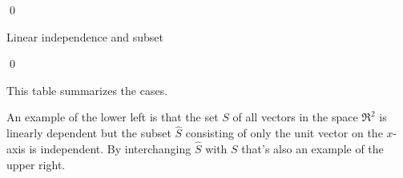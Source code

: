 \documentclass[10pt,t]{beamer}
\begin{document}
\begin{frame}

\pause
\pf
{}
\qed
\end{frame}




\begin{frame}{Linear independence and subset}
\lm[le:SubsetPreserveLI]

\pf
{}
\qed

\pause
\medskip
This table summarizes the cases.
\medskip

An example of the lower left is that the set $S$ of all vectors in the
space $\Re^2$ is linearly dependent but the subset $\hat{S}$ consisting of only the 
unit vector on the $x$-axis is independent.
By interchanging $\hat{S}$ with $S$ that's also an example of the upper right.
\end{frame}



% 
\end{document}

